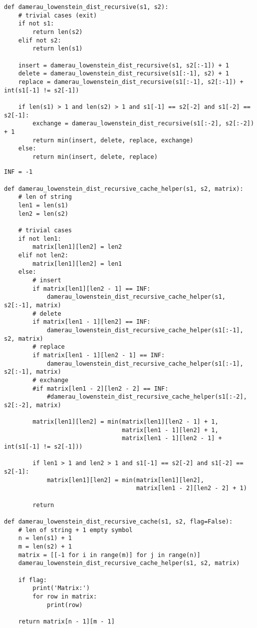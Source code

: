 \begin{lstlisting}[caption=Функция рекурсивного алгоритма поиска расстояния Дамерау-Левенштейна без кеширования,
	label={dleven_rec}]
def damerau_lowenstein_dist_recursive(s1, s2):
    # trivial cases (exit)
    if not s1:
        return len(s2)
    elif not s2:
        return len(s1)

    insert = damerau_lowenstein_dist_recursive(s1, s2[:-1]) + 1
    delete = damerau_lowenstein_dist_recursive(s1[:-1], s2) + 1
    replace = damerau_lowenstein_dist_recursive(s1[:-1], s2[:-1]) + int(s1[-1] != s2[-1])

    if len(s1) > 1 and len(s2) > 1 and s1[-1] == s2[-2] and s1[-2] == s2[-1]:
        exchange = damerau_lowenstein_dist_recursive(s1[:-2], s2[:-2]) + 1
        return min(insert, delete, replace, exchange)
    else:
        return min(insert, delete, replace)

\end{lstlisting}

\begin{lstlisting}[caption=Функция рекурсивного алгоритма поиска расстояния Дамерау-Левенштейна с кешированием,
	label={dlev_rec_cash}]
INF = -1

def damerau_lowenstein_dist_recursive_cache_helper(s1, s2, matrix):
    # len of string
    len1 = len(s1)
    len2 = len(s2)

    # trivial cases
    if not len1:
        matrix[len1][len2] = len2
    elif not len2:
        matrix[len1][len2] = len1
    else:
        # insert
        if matrix[len1][len2 - 1] == INF:
            damerau_lowenstein_dist_recursive_cache_helper(s1, s2[:-1], matrix)
        # delete
        if matrix[len1 - 1][len2] == INF:
            damerau_lowenstein_dist_recursive_cache_helper(s1[:-1], s2, matrix)
        # replace
        if matrix[len1 - 1][len2 - 1] == INF:
            damerau_lowenstein_dist_recursive_cache_helper(s1[:-1], s2[:-1], matrix)
        # exchange
        #if matrix[len1 - 2][len2 - 2] == INF:
            #damerau_lowenstein_dist_recursive_cache_helper(s1[:-2], s2[:-2], matrix)

        matrix[len1][len2] = min(matrix[len1][len2 - 1] + 1,
                                 matrix[len1 - 1][len2] + 1,
                                 matrix[len1 - 1][len2 - 1] + int(s1[-1] != s2[-1]))

        if len1 > 1 and len2 > 1 and s1[-1] == s2[-2] and s1[-2] == s2[-1]:
            matrix[len1][len2] = min(matrix[len1][len2],
                                     matrix[len1 - 2][len2 - 2] + 1)

        return
        
def damerau_lowenstein_dist_recursive_cache(s1, s2, flag=False):
    # len of string + 1 empty symbol
    n = len(s1) + 1
    m = len(s2) + 1
    matrix = [[-1 for i in range(m)] for j in range(n)]
    damerau_lowenstein_dist_recursive_cache_helper(s1, s2, matrix)

    if flag:
        print('Matrix:')
        for row in matrix:
            print(row)

    return matrix[n - 1][m - 1]
\end{lstlisting}

